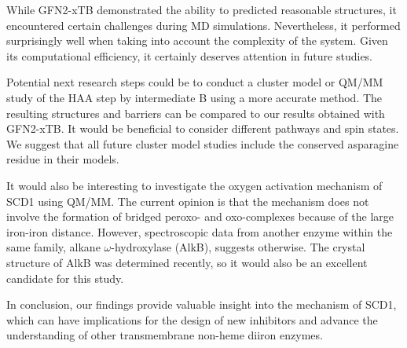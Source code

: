 While GFN2-xTB demonstrated the ability to predicted reasonable structures, it encountered certain challenges during MD simulations. Nevertheless, it performed surprisingly well when taking into account the complexity of the system. Given its computational efficiency, it certainly deserves attention in future studies.

Potential next research steps could be to conduct a cluster model or QM/MM study of the HAA step by intermediate B using a more accurate method. The resulting structures and barriers can be compared to our results obtained with GFN2-xTB. It would be beneficial to consider different pathways and spin states. We suggest that all future cluster model studies include the conserved asparagine residue in their models. 

It would also be interesting to investigate the oxygen activation mechanism of SCD1 using QM/MM. The current opinion is that the mechanism does not involve the formation of bridged peroxo- and oxo-complexes because of the large iron-iron distance. However, spectroscopic data from another enzyme within the same family, alkane $\omega$-hydroxylase (AlkB), suggests otherwise. The crystal structure of AlkB was determined recently, so it would also be an excellent candidate for this study.

In conclusion, our findings provide valuable insight into the mechanism of SCD1, which can have implications for the design of new inhibitors and advance the understanding of other transmembrane non-heme diiron enzymes. 

